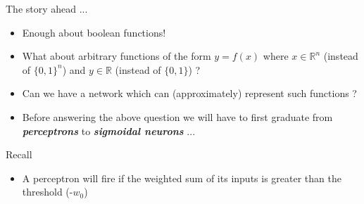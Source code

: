 \begin{frame}
\end{frame}

\begin{frame}
	\begin{block}{The story ahead ...}
		\begin{itemize}\justifying
			\item<1-> Enough about boolean functions!
			\item<2-> What about arbitrary functions of the form $y=f(x)$ where $x\in \mathbb{R}^n$ (instead of $\{0, 1\}^n$) and $y \in \mathbb{R}$ (instead of $\{0, 1\}$) ?
			\item<3-> Can we have a network which can (approximately) represent such functions ?
			\item<4-> Before answering the above question we will have to first graduate from \textbf{\textit{perceptrons}} to \textbf{\textit{sigmoidal neurons}} ...
		\end{itemize}
	\end{block}
\end{frame}

\begin{frame}
	\begin{block}{Recall}
		\begin{itemize}\justifying
			\item A perceptron will fire if the weighted sum of its inputs is greater than the threshold (-$w_0$)
		\end{itemize}
	\end{block}
\end{frame}


